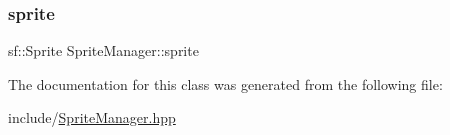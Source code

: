 \mbox{\label{class_sprite_manager_aaa4c24e6db93bef8a28b38cb8de839c1}} 
\subsubsection{\texorpdfstring{sprite}{sprite}}
{\footnotesize\ttfamily sf\+::\+Sprite Sprite\+Manager\+::sprite\hspace{0.3cm}{\ttfamily [private]}}



The documentation for this class was generated from the following file\+:\begin{DoxyCompactItemize}
\item 
include/\mbox{\hyperlink{_sprite_manager_8hpp}{Sprite\+Manager.\+hpp}}\end{DoxyCompactItemize}
